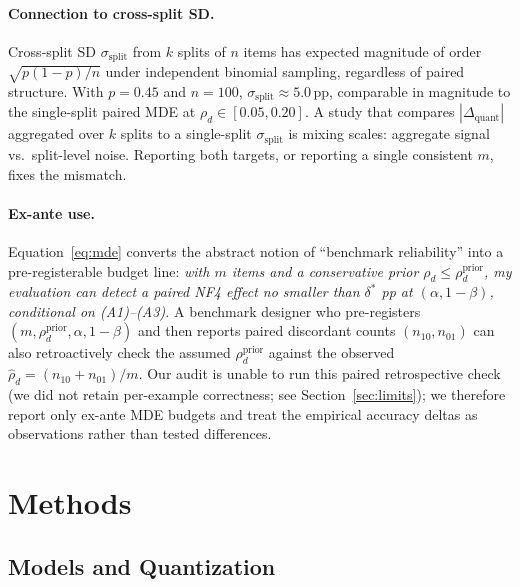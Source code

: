 \documentclass{article}
\begin{document}
\paragraph{Connection to cross-split SD.}
Cross-split SD $\sigma_{\text{split}}$ from $k$ splits of $n$ items has expected magnitude of order $\sqrt{p(1-p)/n}$ under independent binomial sampling, regardless of paired structure. With $p{=}0.45$ and $n{=}100$, $\sigma_{\text{split}}\approx 5.0$\,pp, comparable in magnitude to the single-split paired MDE at $\rho_d \in [0.05, 0.20]$. A study that compares $|\Delta_{\text{quant}}|$ aggregated over $k$ splits to a single-split $\sigma_{\text{split}}$ is mixing scales: aggregate signal vs.\ split-level noise. Reporting both targets, or reporting a single consistent $m$, fixes the mismatch.

\paragraph{Ex-ante use.}
Equation~\ref{eq:mde} converts the abstract notion of ``benchmark reliability'' into a pre-registerable budget line: \emph{with $m$ items and a conservative prior $\rho_d \le \rho^{\text{prior}}_d$, my evaluation can detect a paired NF4 effect no smaller than $\delta^*$ pp at $(\alpha, 1-\beta)$, conditional on (A1)--(A3).} A benchmark designer who pre-registers $(m, \rho^{\text{prior}}_d, \alpha, 1-\beta)$ and then reports paired discordant counts $(n_{10}, n_{01})$ can also retroactively check the assumed $\rho^{\text{prior}}_d$ against the observed $\hat\rho_d = (n_{10}+n_{01})/m$. Our audit is unable to run this paired retrospective check (we did not retain per-example correctness; see Section~\ref{sec:limits}); we therefore report only ex-ante MDE budgets and treat the empirical accuracy deltas as observations rather than tested differences.

\section{Methods}

\subsection{Models and Quantization}
\label{sec:models}
\end{document}
